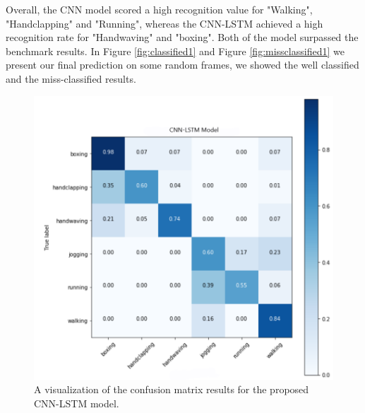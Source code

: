 Overall, the CNN model scored a high recognition value for "Walking", "Handclapping" and "Running", whereas the CNN-LSTM achieved a high recognition rate for "Handwaving" and "boxing". Both of the model surpassed the benchmark results. In Figure \ref{fig:classified1} and Figure \ref{fig:missclassified1} we present our final prediction on some random frames, we showed the well classified and the miss-classified results. 
\begin{figure}[ht]
\centering
\includegraphics[width=1.0\columnwidth]{Figures/cnnlstmodel.png}
\decoRule
\caption[A visualization of the confusion matrix results for the proposed CNN-LSTM model.]{A visualization of the confusion matrix results for the proposed CNN-LSTM model.}
\label{fig:cmsnnlstm}
\end{figure}


